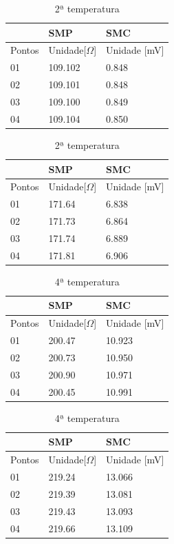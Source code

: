 \documentclass[a4paper,11pt]{article}
\begin{document}
\FloatBarrier
\begin{table}[!htp]
	\parbox{.45\linewidth}{
		\centering
		\begin{tabular}{|l|l|l|} \hline
			& SMP & SMC \\ \hline
			Pontos & Unidade[$\Omega$] & Unidade [mV]\\ \hline
			01&109.102 & 0.848 \\ \hline
			02&109.101 & 0.848\\ \hline
			03&109.100 & 0.849\\ \hline
			04&109.104 & 0.850\\ \hline
		\end{tabular}

		\caption{1ª temperatura}
		}
\hfill
	\parbox{.45\linewidth}{
		\centering
		\begin{tabular}{|l|l|l|} \hline
			& SMP & SMC \\ \hline
			Pontos & Unidade[$\Omega$] & Unidade [mV]\\ \hline
			01	&	171.64 & 6.838 \\ \hline
			02	&	171.73 & 6.864\\ \hline
			03	&	171.74 & 6.889\\ \hline
			04	&	171.81 & 6.906\\ \hline
		\end{tabular}

		\caption{2ª temperatura}
		}
\end{table}

\begin{table}[!htp]
	\parbox{.45\linewidth}{
		\centering
		\begin{tabular}{|l|l|l|} \hline
			& SMP & SMC \\ \hline
			Pontos & Unidade[$\Omega$] & Unidade [mV]\\ \hline
			01	& 200.47 & 10.923 \\ \hline
			02	& 200.73 & 10.950\\ \hline
			03	& 200.90 & 10.971\\ \hline
			04	& 200.45 & 10.991\\ \hline
		\end{tabular}

		\caption{3ª temperatura}
		}
\hfill
	\parbox{.45\linewidth}{
		\centering
		\begin{tabular}{|l|l|l|} \hline
			& SMP & SMC \\ \hline
			Pontos & Unidade[$\Omega$] & Unidade [mV]\\ \hline
			01	& 219.24 & 13.066 \\ \hline
			02	& 219.39 & 13.081\\ \hline
			03	& 219.43 & 13.093\\ \hline
			04	& 219.66 & 13.109\\ \hline
		\end{tabular}

		\caption{4ª temperatura}
		}
\end{table}
\FloatBarrier
\end{document}

